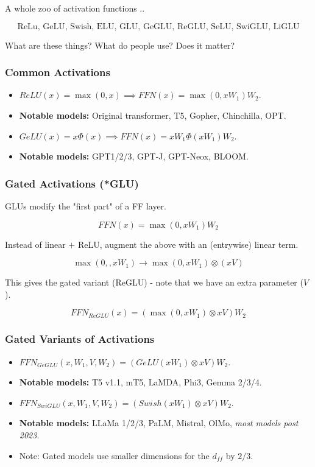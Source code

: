 \documentclass[12pt,twoside]{article}
\begin{document}
A whole zoo of activation functions ..

\[
    \text{ReLu, GeLU, Swish, ELU, GLU, GeGLU, ReGLU, SeLU, SwiGLU, LiGLU}
\]

What are these things? What do people use? Does it matter?

\subsubsection*{Common Activations}

\begin{itemize}
    \item \(ReLU(x)= \max(0, x) \implies FFN(x) = \max(0, xW_1)W_2\).
    \item \textbf{Notable models:} Original transformer, T5, Gopher, Chinchilla, OPT. 
    \item \(GeLU(x) = x\Phi(x) \implies FFN(x) = xW_1\Phi(xW_1)W_2\).
    \item \textbf{Notable models:} GPT1/2/3, GPT-J, GPT-Neox, BLOOM.
\end{itemize}

\subsubsection*{Gated Activations (*GLU)}

GLUs modify the "first part" of a FF layer.

\[
    FFN(x) = \max(0, xW_1)W_2
\]

Instead of linear \(+\) ReLU, augment the above with an (entrywise) linear term.

\[
    \max(0,, xW_1) \to \max(0, xW_1) \otimes (xV)
\]

This gives the gated variant (ReGLU) - note that we have an extra parameter (\(V\)).

\[
    FFN_{ReGLU}(x) = (\max(0, xW_1) \otimes xV)W_2
\]

\subsubsection*{Gated Variants of Activations}

\begin{itemize}
    \item \(FFN_{GeGLU}(x, W_1, V, W_2) = (GeLU(xW_1) \otimes xV)W_2\).
    \item \textbf{Notable models:} T5 v1.1, mT5, LaMDA, Phi3, Gemma 2/3/4.
    \item \(FFN_{SwiGLU}(x, W_1, V, W_2) = (Swish(xW_1) \otimes xV)W_2\).
    \item \textbf{Notable models:} LLaMa 1/2/3, PaLM, Mistral, OlMo, \textit{most models post 2023}.
    \item Note: Gated models use smaller dimensions for the \(d_{ff}\) by \(2 / 3\).
\end{itemize}
\end{document}
